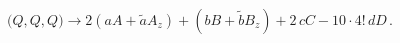 \begin{equation}
\big(Q,Q,Q\big) \rightarrow 2(aA + \tilde{a} A_z) 
+ (bB + \tilde{b}B_z) + 2\,cC - 10\cdot 4!\, dD\, .
\end{equation}

